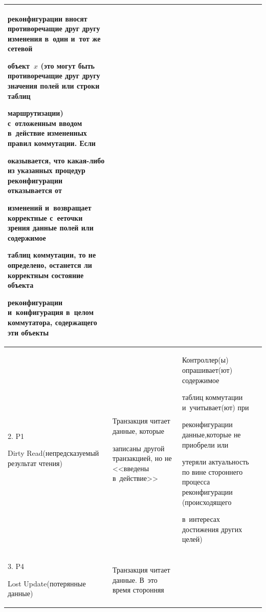 {\begin{table}
\begin{center}
\begin{tabular}{|p{52.7pt}|p{130pt}|p{170.4pt}|}
{реконфигурации вносят противоречащие друг другу изменения в~один и~тот же сетевой 


объект~$x$ (это могут быть противоречащие друг другу значения полей или строки таблиц 


маршрутизации) с~отложенным вводом в~действие измененных правил коммутации. Если 


оказы\-вается, что ка\-кая-ли\-бо из указанных процедур реконфигурации отказывается от 


изменений и~возвращает корректные с~ее\linebreak точки зрения данные полей или содержимое 


таблиц коммутации, то не определено, останется ли корректным состояние объекта 


реконфигурации и~конфигурация в~целом коммутатора, содержащего эти объ\-екты 


}


\\


\hline


2. P1\newline 


Dirty Read\newline (не\-пред\-ска\-зу\-емый результат чтения)&


Транзакция читает данные, которые 


записаны другой транзакцией, но не <<введены в~действие>>&


{%


Контроллер(ы) опрашивает(ют) содер\-жимое 


таблиц коммутации и~учитывает(ют) при


 реконфигурации данные,\linebreak которые не приобрели или 


утеряли ак\-ту\-аль\-ность по вине стороннего процесса реконфигурации (происходящего 


в~интересах достижения других целей)


}\\


\hline


3. P4\newline 


Lost Update\newline (потерянные данные)&


{%


Транзакция читает данные. В~это время сторонняя 


}
\end{tabular}
\end{center}
\end{table}}
